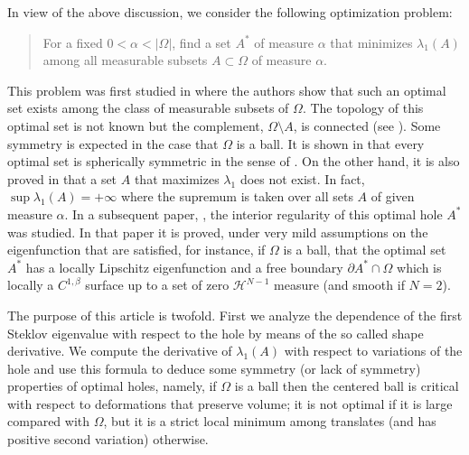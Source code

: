 \documentclass[11pt]{amsart}
\theoremstyle{remark}
\numberwithin{equation}{section}
\begin{document}
In view of the above discussion, we consider the following optimization problem:
\begin{quote}
For a fixed $0<\alpha<|\Omega|$, find a set $A^*$ of measure $\alpha$ that minimizes $\lambda_1(A)$ among all measurable subsets $A\subset\Omega$ of measure $\alpha$.
\end{quote}
This problem was first studied in \cite{FBRW1} where the authors show that such an optimal set exists among the class of measurable subsets of $\Omega$. The topology of this optimal set is not known but the complement, $\Omega\setminus A$, is connected (see \cite{FBRW1}). Some symmetry is expected in the case that $\Omega$ is a ball. It is shown in \cite{FBRW1} that every optimal set is spherically symmetric in the sense of \cite{Sp}. On the other hand, it is also proved in \cite{FBRW1} that a set $A$ that maximizes $\lambda_1$ does not exist. In fact, $\sup\lambda_1(A)=+\infty$ where the supremum is taken over all sets $A$ of given measure $\alpha$. In a subsequent paper, \cite{FBRW2}, the interior regularity of this optimal hole $A^*$ was studied. In that paper it is proved, under very mild assumptions on the eigenfunction that are satisfied, for instance, if $\Omega$ is a ball, that the optimal set $A^*$ has a locally Lipschitz eigenfunction and a free boundary $\partial A^*\cap\Omega$ which is locally a $C^{1,\beta}$ surface up to a set of zero $\mathcal{H}^{N-1}$ measure (and smooth if $N=2$).

The purpose of this article is twofold. First we analyze the dependence of the first Steklov eigenvalue with respect to the hole by means of the so called shape derivative. We compute the derivative of $\lambda_1(A)$ with respect to variations of the hole and use this formula to deduce some symmetry (or lack of symmetry) properties of optimal holes, namely, if $\Omega$ is a ball then the centered ball is critical with respect to deformations that preserve volume; it is not optimal if it is large compared with $\Omega$, but it is a strict local minimum among translates (and has positive second variation) otherwise.
\end{document}
